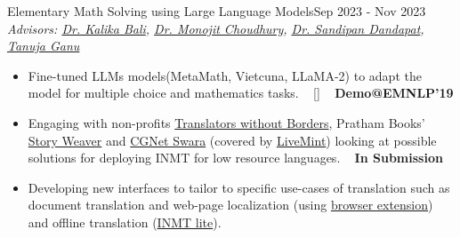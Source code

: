 \begin{projects}

\project
	{Elementary Math Solving using Large Language Models}{Sep 2023 - Nov 2023}
	{
	    \textit{Advisors:  \href{https://www.microsoft.com/en-us/research/people/kalikab/}{Dr. Kalika Bali}, \href{https://www.microsoft.com/en-us/research/people/monojitc/}{Dr. Monojit Choudhury}, \href{https://www.microsoft.com/en-us/research/people/monojitc/}{Dr. Sandipan Dandapat}, \href{https://www.microsoft.com/en-us/research/people/monojitc/}{Tanuja Ganu}}
	}
	{\begin{itemize}
	\setlength\itemsep{0.3em}
     \item Fine-tuned LLMs models(MetaMath, Vietcuna, LLaMA-2) to adapt the model for multiple choice and mathematics tasks. ~ [\href{https://microsoft.github.io/inmt/}{\small{\websiteSymbol}}] ~ {\small{\lbrack\textbf{{Demo@EMNLP'19}}\rbrack}}
     \item Engaging with non-profits \href{https://translatorswithoutborders.org/}{Translators without Borders}, Pratham Books' \href{https://storyweaver.org.in/}{Story Weaver} and \href{http://cgnetswara.org/}{CGNet Swara} (covered by \href{https://www.livemint.com/mint-lounge/features/now-a-unique-machine-translation-tool-from-hindi-to-gondi-11597386377981.html}{LiveMint}) looking at possible solutions for deploying INMT for low resource languages. ~ {\small{\lbrack\textbf{{In Submission}}\rbrack}}
     \item Developing new interfaces to tailor to specific use-cases of translation such as document translation and web-page localization (using \href{github.com/microsoft/inmt-browser}{browser extension}) and offline translation (\href{https://github.com/microsoft/INMT-lite}{INMT lite}).
     \end{itemize}}
     

\end{projects}
